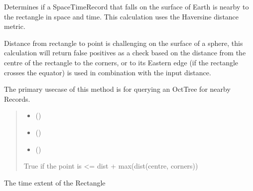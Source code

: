 \documentclass[letterpaper,10pt,english]{sphinxmanual}
\begin{document}
\begin{fulllineitems}
\begin{fulllineitems}
\sphinxAtStartPar
Determines if a SpaceTimeRecord that falls on the surface of Earth is
nearby to the rectangle in space and time. This calculation uses the
Haversine distance metric.

\sphinxAtStartPar
Distance from rectangle to point is challenging on the surface of a
sphere, this calculation will return false positives as a check based
on the distance from the centre of the rectangle to the corners, or
to its Eastern edge (if the rectangle crosses the equator) is used in
combination with the input distance.

\sphinxAtStartPar
The primary use\sphinxhyphen{}case of this method is for querying an OctTree for
nearby Records.
\begin{quote}\begin{description}
\begin{itemize}
\item {} 
\sphinxAtStartPar
{} ({\hyperref[\detokenize{users_guide:GeoSpatialTools.octtree.SpaceTimeRecord}]{}})

\item {} 
\sphinxAtStartPar
{} (\sphinxstyleliteralemphasis{\sphinxupquote{,}})

\item {} 
\sphinxAtStartPar
{} ()

\end{itemize}

\sphinxAtStartPar
{}

\sphinxAtStartPar
True if the point is \textless{}= dist + max(dist(centre, corners))

\end{description}\end{quote}

\end{fulllineitems}


\begin{fulllineitems}
\label{\detokenize{users_guide:GeoSpatialTools.octtree.SpaceTimeRectangle.time_range}}
\pysigstartsignatures
{}
\pysigstopsignatures
\sphinxAtStartPar
The time extent of the Rectangle

\end{fulllineitems}


\end{fulllineitems}
\end{document}
